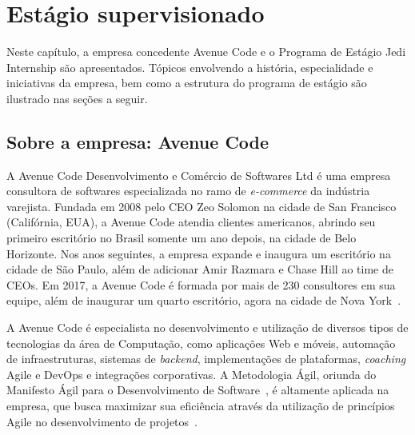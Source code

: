 \chapter{Estágio supervisionado}
\label{cap:estagio-supervisionado}

Neste capítulo, a empresa concedente Avenue Code e o Programa de Estágio Jedi Internship são apresentados. Tópicos envolvendo a história, especialidade e iniciativas da empresa, bem como a estrutura do programa de estágio são ilustrado nas seções a seguir.

\section{Sobre a empresa: Avenue Code}
\label{sec:sobre-a-empresa}

A Avenue Code Desenvolvimento e Comércio de Softwares Ltd é uma empresa consultora de softwares especializada no ramo de \textit{e-commerce} da indústria varejista. Fundada em 2008 pelo CEO Zeo Solomon na cidade de San Francisco (Califórnia, EUA), a Avenue Code atendia clientes americanos, abrindo seu primeiro escritório no Brasil somente um ano depois, na cidade de Belo Horizonte. Nos anos seguintes, a empresa expande e inaugura um escritório na cidade de São Paulo, além de adicionar Amir Razmara e Chase Hill ao time de CEOs. Em 2017, a Avenue Code é formada por mais de 230 consultores em sua equipe, além de inaugurar um quarto escritório, agora na cidade de Nova York~\cite{avenuecode-2017}.

A Avenue Code é especialista no desenvolvimento e utilização de diversos tipos de tecnologias da área de Computação, como aplicações Web e móveis, automação de infraestruturas, sistemas de \textit{backend}, implementações de plataformas, \textit{coaching} Agile e DevOps e integrações corporativas. A Metodologia Ágil, oriunda do Manifesto Ágil para o Desenvolvimento de Software~\cite{agile-2001}, é altamente aplicada na empresa, que busca maximizar sua eficiência através da utilização de princípios Agile no desenvolvimento de projetos~\cite{avenuecode-2017}.

